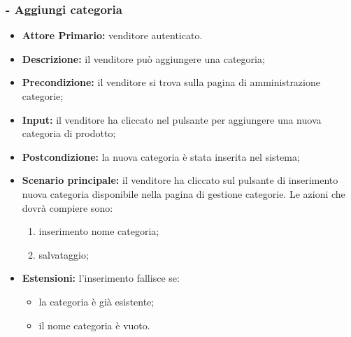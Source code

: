 \stepsubUserCase
\subsubsection{- Aggiungi categoria}
\begin{itemize}
    \item \textbf{Attore Primario:} venditore autenticato.
    \item \textbf{Descrizione:} il venditore può aggiungere una categoria;
    \item \textbf{Precondizione:} il venditore si trova sulla pagina di amministrazione categorie;
    \item \textbf{Input:} il venditore ha cliccato nel pulsante per aggiungere una nuova categoria di prodotto;
    \item \textbf{Postcondizione:} la nuova categoria è stata inserita nel sistema;
    \item \textbf{Scenario principale:} il venditore ha cliccato sul pulsante di inserimento nuova categoria disponibile nella pagina di gestione categorie. Le azioni che dovrà compiere sono:
          \begin{enumerate}
              \item inserimento nome categoria;
              \item salvataggio;
          \end{enumerate}
    \item \textbf{Estensioni:} l'inserimento fallisce se:
          \begin{itemize}
              \item la categoria è già esistente;
              \item il nome categoria è vuoto.
          \end{itemize}
\end{itemize}

\stepsubUserCase
